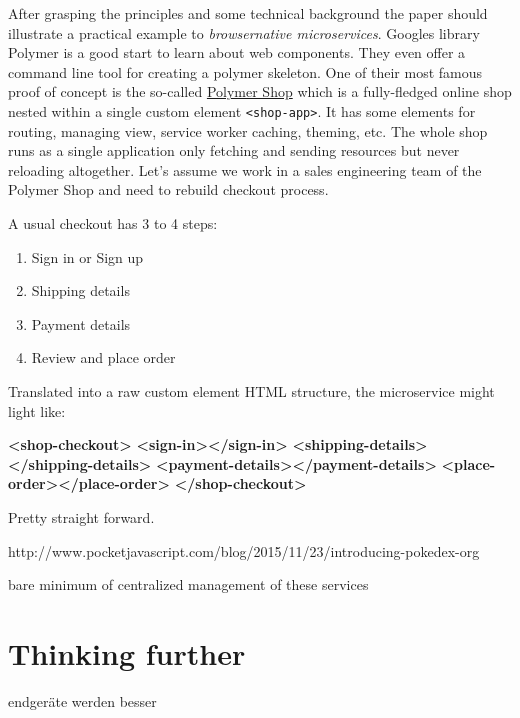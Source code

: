 \documentclass[]{assets/latex/ieee}
\newenvironment{Shaded}{}{}
\newcommand{\KeywordTok}[1]{\textcolor[rgb]{0.00,0.44,0.13}{\textbf{{#1}}}}
\providecommand{\tightlist}{%
  \setlength{\itemsep}{0pt}\setlength{\parskip}{0pt}}
\begin{document}
After grasping the principles and some technical background the paper
should illustrate a practical example to \emph{browsernative
microservices}. Googles library Polymer is a good start to learn about
web components. They even offer a command line tool for creating a
polymer skeleton. One of their most famous proof of concept is the
so-called \href{https://shop.polymer-project.org/}{Polymer Shop} which
is a fully-fledged online shop nested within a single custom element
\texttt{\textless{}shop-app\textgreater{}}. It has some elements for
routing, managing view, service worker caching, theming, etc. The whole
shop runs as a single application only fetching and sending resources
but never reloading altogether. Let's assume we work in a sales
engineering team of the Polymer Shop and need to rebuild checkout
process.

A usual checkout has 3 to 4 steps:

\begin{enumerate}
\def\labelenumi{\arabic{enumi}.}
\tightlist
\item
  Sign in or Sign up
\item
  Shipping details
\item
  Payment details
\item
  Review and place order
\end{enumerate}

Translated into a raw custom element HTML structure, the microservice
might light like:

\begin{Shaded}
\begin{Highlighting}[]
\KeywordTok{<shop-checkout>}
  \KeywordTok{<sign-in></sign-in>}
  \KeywordTok{<shipping-details></shipping-details>}
  \KeywordTok{<payment-details></payment-details>}
  \KeywordTok{<place-order></place-order>}
\KeywordTok{</shop-checkout>}
\end{Highlighting}
\end{Shaded}

Pretty straight forward.

http://www.pocketjavascript.com/blog/2015/11/23/introducing-pokedex-org

bare minimum of centralized management of these services

\section{Thinking further}\label{thinking-further}

endgeräte werden besser
\end{document}
